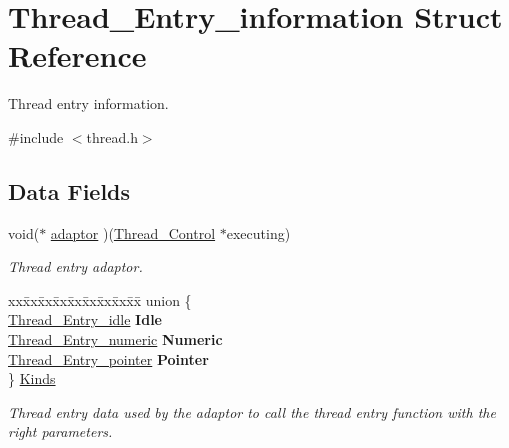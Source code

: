 \hypertarget{structThread__Entry__information}{}\section{Thread\+\_\+\+Entry\+\_\+information Struct Reference}
\label{structThread__Entry__information}


Thread entry information.  




{\ttfamily \#include $<$thread.\+h$>$}

\subsection*{Data Fields}
\begin{DoxyCompactItemize}
\item 
void($\ast$ \mbox{\hyperlink{structThread__Entry__information_aae83b0a3a7a31870376451587ca2530d}{adaptor}} )(\mbox{\hyperlink{struct__Thread__Control}{Thread\+\_\+\+Control}} $\ast$executing)
\begin{DoxyCompactList}\small\item\em Thread entry adaptor. \end{DoxyCompactList}\item 
\mbox{\label{structThread__Entry__information_a3c66b49123b66c7d63a84212f0cac556}} 
\begin{tabbing}
xx\=xx\=xx\=xx\=xx\=xx\=xx\=xx\=xx\=\kill
union \{\\
\>\mbox{\hyperlink{structThread__Entry__idle}{Thread\_Entry\_idle}} {\bfseries Idle}\\
\>\mbox{\hyperlink{structThread__Entry__numeric}{Thread\_Entry\_numeric}} {\bfseries Numeric}\\
\>\mbox{\hyperlink{structThread__Entry__pointer}{Thread\_Entry\_pointer}} {\bfseries Pointer}\\
\} \mbox{\hyperlink{structThread__Entry__information_a3c66b49123b66c7d63a84212f0cac556}{Kinds}}\\

\end{tabbing}\begin{DoxyCompactList}\small\item\em Thread entry data used by the adaptor to call the thread entry function with the right parameters. \end{DoxyCompactList}\end{DoxyCompactItemize}


